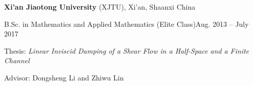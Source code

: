 \documentclass[margin,line]{res}
\newenvironment{list1}{
  \begin{list}{\ding{113}}{%
      \setlength{\itemsep}{0in}
      \setlength{\parsep}{0in} \setlength{\parskip}{0in}
      \setlength{\topsep}{0in} \setlength{\partopsep}{0in} 
      \setlength{\leftmargin}{0.17in}}}{\end{list}}
\begin{document}
\begin{resume}
{\bf Xi'an Jiaotong University} (XJTU), Xi'an, Shaanxi China\\
\vspace*{-.1in}
\begin{list1}
\item[] B.Sc. in Mathematics and Applied Mathematics (Elite Class)\hfill Aug. 2013 -- July 2017
\item[] Thesis: \textit{Linear Inviscid Damping of a Shear Flow in a Half-Space and  a Finite Channel}
\item[] Advisor: Dongsheng Li and Zhiwu Lin
\end{list1}






\end{resume}
\end{document}
